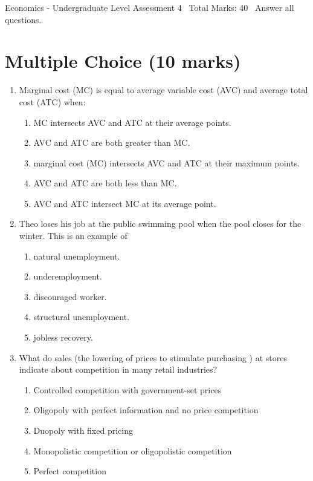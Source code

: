 \documentclass[12pt]{article}
\begin{document}
\begin{center}
Economics - Undergraduate Level Assessment 4 \
Total Marks: 40 \
Answer all questions.
\end{center}

\section*{Multiple Choice (10 marks)}
\begin{enumerate}[label=\arabic*.]
\item Marginal cost (MC) is equal to average variable cost (AVC) and average total cost (ATC)
when:
\begin{enumerate}[label=(\alph*)]
    \item MC intersects AVC and ATC at their average points.
    \item AVC and ATC are both greater than MC.
    \item marginal cost (MC) intersects AVC and ATC at their maximum points.
    \item AVC and ATC are both less than MC.
    \item AVC and ATC intersect MC at its average point.
\end{enumerate}
\item Theo loses his job at the public swimming pool when the pool closes for the winter. This
is an example of
\begin{enumerate}[label=(\alph*)]
    \item natural unemployment.
    \item underemployment.
    \item discouraged worker.
    \item structural unemployment.
    \item jobless recovery.
\end{enumerate}
\item What do sales (the lowering of prices to stimulate purchasing ) at stores indicate about
competition in many retail industries?
\begin{enumerate}[label=(\alph*)]
    \item Controlled competition with government-set prices
    \item Oligopoly with perfect information and no price competition
    \item Duopoly with fixed pricing
    \item Monopolistic competition or oligopolistic competition
    \item Perfect competition

\end{enumerate}
\end{enumerate}
\end{document}
